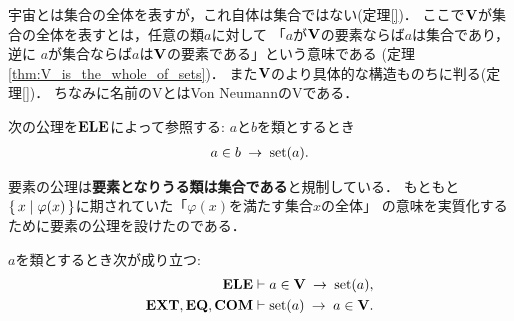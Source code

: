 	宇宙とは集合の全体を表すが，これ自体は集合ではない(定理\ref{})．
	ここで$\mathbf{V}$が集合の全体を表すとは，任意の類$a$に対して
	「$a$が$\mathbf{V}$の要素ならば$a$は集合であり，逆に
	$a$が集合ならば$a$は$\mathbf{V}$の要素である」という意味である
	(定理\ref{thm:V_is_the_whole_of_sets})．
	また$\mathbf{V}$のより具体的な構造ものちに判る(定理\ref{})．
	ちなみに名前のVとはVon NeumannのVである．
	
	\begin{screen}
		\begin{axm}[要素の公理]
			次の公理を$\mbox{{\bf ELE}}$によって参照する:
			$a$と$b$を類とするとき
			\begin{align}
				a \in b \hspace{0.25em}\rightarrow\hspace{0.25em} \operatorname*{set} (a).
			\end{align}
		\end{axm}
	\end{screen}
	
	要素の公理は{\bf 要素となりうる類は集合である}と規制している．
	もともと$\left\{\, x \mid \varphi(x)\, \right\}$に期されていた「$\varphi(x)$を満たす集合$x$の全体」
	の意味を実質化するために要素の公理を設けたのである．
	
	\begin{screen}
		\begin{thm}
		\label{thm:V_is_the_whole_of_sets}
			$a$を類とするとき次が成り立つ:
			\begin{align}
				\mbox{{\bf ELE}} &\vdash a \in \mathbf{V} \hspace{0.25em}\rightarrow\hspace{0.25em} \operatorname*{set} (a), \\
				\mbox{{\bf EXT}},\mbox{{\bf EQ}},\mbox{\bf COM} &\vdash \operatorname*{set} (a) \hspace{0.25em}\rightarrow\hspace{0.25em} a \in \mathbf{V}.
			\end{align}
		\end{thm}
	\end{screen}
	
